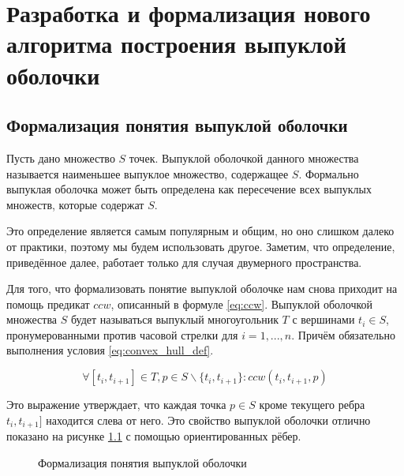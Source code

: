 \chapter{Разработка и формализация нового алгоритма построения выпуклой оболочки} \label{chapt2}

\section{Формализация понятия выпуклой оболочки} \label{sect2_1}

Пусть дано множество $S$ точек. Выпуклой оболочкой данного множества называется наименьшее выпуклое множество, содержащее $S$. Формально выпуклая оболочка может быть определена как пересечение всех выпуклых множеств, которые содержат $S$.

Это определение является самым популярным и общим, но оно слишком далеко от практики, поэтому мы будем использовать другое. Заметим, что определение, приведённое далее, работает только для случая двумерного пространства.

Для того, что формализовать понятие выпуклой оболочке нам снова приходит на помощь предикат $ccw$, описанный в формуле \ref{eq:ccw}. Выпуклой оболочкой множества $S$ будет называться выпуклый многоугольник $T$ с вершинами $t_i \in S$, пронумерованными против часовой стрелки для $i = 1,...,n$. Причём обязательно выполнения условия \ref{eq:convex_hull_def}.

\begin{equation}\label{eq:convex_hull_def}
\forall [t_i, t_{i+1}] \in T, p \in S \backslash \{ t_i, t_{i+1} \} : ccw(t_i, t_{i+1}, p)
\end{equation}

Это выражение утверждает, что каждая точка $p \in S$ кроме текущего ребра $t_i, t_{i+1}]$ находится слева от него. Это свойство выпуклой оболочки отлично показано на рисунке \ref{img:convex_hull_def} с помощью ориентированных рёбер.

\begin{figure}[H]
	{\centering
		\hfill
		\hfill
		\hfill
	}
	\caption{Формализация понятия выпуклой оболочки}
	\label{img:convex_hull_def}
\end{figure}

